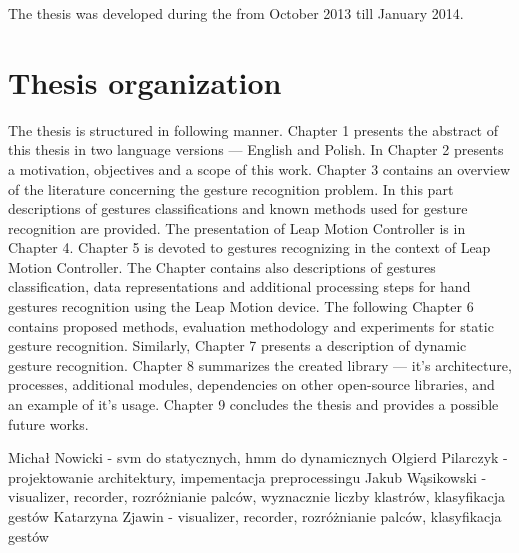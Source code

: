 The thesis was developed during the from October 2013 till January 2014.


\section{Thesis organization}
The thesis is structured in following manner. 
Chapter 1 presents the abstract of this thesis in two language versions --- English and Polish. 
In Chapter 2 presents a motivation, objectives and a scope of this work. 
Chapter 3 contains an overview of the literature concerning the gesture recognition problem. 
In this part descriptions of gestures classifications and known methods used for gesture recognition are provided. 
The presentation of Leap Motion Controller is in Chapter 4. Chapter 5 is devoted to gestures recognizing in the context of Leap Motion Controller.
The Chapter contains also descriptions of gestures classification, data representations and additional processing steps for hand gestures recognition using the Leap Motion device. 
The following Chapter 6 contains proposed methods, evaluation methodology and experiments for static gesture recognition. 
Similarly, Chapter 7 presents a description of dynamic gesture recognition. 
Chapter 8 summarizes the created library --- it's architecture, processes, additional modules, dependencies on other open-source libraries, and an example of it's usage. 
Chapter 9 concludes the thesis and provides a possible future works. 

{\color{red} Michał Nowicki - svm do statycznych, hmm do dynamicznych
Olgierd Pilarczyk - projektowanie architektury, impementacja preprocessingu
Jakub Wąsikowski - visualizer, recorder, rozróżnianie palców, wyznacznie liczby klastrów, klasyfikacja gestów
Katarzyna Zjawin - visualizer, recorder, rozróżnianie palców, klasyfikacja gestów}

